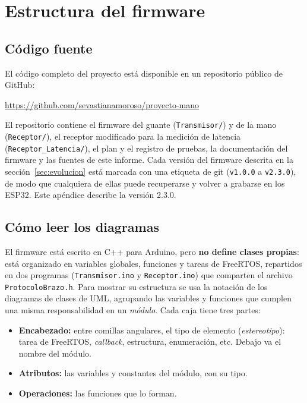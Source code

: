 \section{Estructura del firmware}
\label{sec:estructura_firmware}

\subsection{Código fuente}
\label{sec:codigo_fuente}

El código completo del proyecto está disponible en un repositorio público de GitHub:

\begin{center}
\url{https://github.com/sevastianamoroso/proyecto-mano}
\end{center}

El repositorio contiene el firmware del guante (\texttt{Transmisor/}) y de la mano (\texttt{Receptor/}), el receptor modificado para la medición de latencia (\texttt{Receptor\_Latencia/}), el plan y el registro de pruebas, la documentación del firmware y las fuentes de este informe. Cada versión del firmware descrita en la sección~\ref{sec:evolucion} está marcada con una etiqueta de git (\texttt{v1.0.0} a \texttt{v2.3.0}), de modo que cualquiera de ellas puede recuperarse y volver a grabarse en los ESP32. Este apéndice describe la versión 2.3.0.

\subsection{Cómo leer los diagramas}

El firmware está escrito en C++ para Arduino, pero \textbf{no define clases propias}: está organizado en variables globales, funciones y tareas de FreeRTOS, repartidos en dos programas (\texttt{Transmisor.ino} y \texttt{Receptor.ino}) que comparten el archivo \texttt{ProtocoloBrazo.h}. Para mostrar su estructura se usa la notación de los diagramas de clases de UML, agrupando las variables y funciones que cumplen una misma responsabilidad en un \emph{módulo}. Cada caja tiene tres partes:

\begin{itemize}
  \item \textbf{Encabezado:} entre comillas angulares, el tipo de elemento (\emph{estereotipo}): tarea de FreeRTOS, \emph{callback}, estructura, enumeración, etc. Debajo va el nombre del módulo.
  \item \textbf{Atributos:} las variables y constantes del módulo, con su tipo.
  \item \textbf{Operaciones:} las funciones que lo forman.
\end{itemize}


